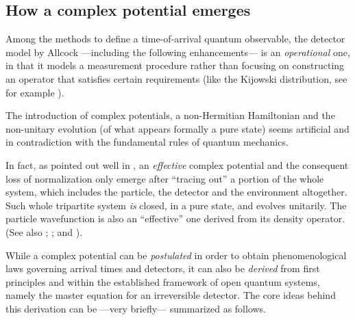 \subsection{How a complex potential emerges}\label{sec:halliwell}

Among the methods to define a time-of-arrival quantum observable,
the detector model by Allcock
---including the following enhancements---
is an \emph{operational} one,
in that it models a measurement procedure \parencite[]{Leavens_TOA}
rather than focusing on constructing an operator that satisfies certain requirements
(like the Kijowski distribution, see for example \cite[]{Leavens_TOA}).

The introduction of complex potentials, a non-Hermitian Hamiltonian and
the non-unitary evolution (of what appears formally a pure state)
seems artificial
and in contradiction with the fundamental rules of quantum mechanics.

\citereset
In fact, as pointed out well in \cite{Halliwell_Irreversible},
an \emph{effective} complex potential and the consequent loss of normalization
only emerge after ``tracing out'' a portion of the whole system,
which includes the particle, the detector and the environment altogether.
Such whole tripartite system \emph{is} closed, in a pure state, and evolves unitarily.
The particle wavefunction is also an ``effective'' one derived from its density operator.
(See also
  \cite{Wave-function_approach, Hegerfeldt_WignerSymposium, TheQuantumJumpApproach};
  \cite[]{TQM2};
and
  \cite[.1 ``Simulating Quantum Trajectories'']{WallsMilburn}).


While a complex potential can be \emph{postulated} in order to obtain
phenomenological laws governing arrival times and detectors,
it can also be \emph{derived} from first principles and within the established framework
of open quantum systems, namely the master equation
for an irreversible detector.
The core ideas behind this derivation
can be ---very briefly--- summarized as follows.

